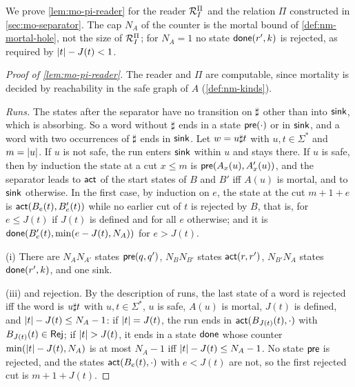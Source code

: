 We prove \cref{lem:mo-pi-reader} for the reader $\mathcal{R}^{\Pi}_I$ and the relation $\Pi$
constructed in \cref{sec:mo-separator}. The cap $N_A$ of the counter is the
mortal bound of \cref{def:nm-mortal-hole}, not the size of $\mathcal{R}^{\Pi}_I$; for $N_A=1$
no state $\mathsf{done}(r',k)$ is rejected, as required by $\lvert t\rvert-J(t)<1$.

\begin{proof}[Proof of \cref{lem:mo-pi-reader}]
The reader and $\Pi$ are computable, since mortality is decided by
reachability in the safe graph of $A$ (\cref{def:nm-kinds}).

\emph{Runs.} The states after the separator have no transition on $\sharp$ other
than into $\mathsf{sink}$, which is absorbing. So a word without $\sharp$ ends in a
state $\mathsf{pre}(\cdot)$ or in $\mathsf{sink}$, and a word with two occurrences of $\sharp$
ends in $\mathsf{sink}$. Let $w=u\sharp t$ with $u,t\in\Sigma^*$ and $m=\lvert u\rvert$. If $u$
is not safe, the run enters $\mathsf{sink}$ within $u$ and stays there. If $u$ is
safe, then by induction the state at a cut $x\le m$ is
$\mathsf{pre}(A_x(u),A'_x(u))$, and the separator leads to $\mathsf{act}$ of the start
states of $B$ and $B'$ iff $A(u)$ is mortal, and to $\mathsf{sink}$ otherwise. In the
first case, by induction on $e$, the state at the cut $m+1+e$ is
$\mathsf{act}(B_e(t),B'_e(t))$ while no earlier cut of $t$ is rejected by $B$, that is,
for $e\le J(t)$ if $J(t)$ is defined and for all $e$ otherwise; and it is
$\mathsf{done}(B'_e(t),\min(e-J(t),N_A))$ for $e>J(t)$.

(i) There are $N_AN_{A'}$ states $\mathsf{pre}(q,q')$, $N_BN_{B'}$ states
$\mathsf{act}(r,r')$, $N_{B'}N_A$ states $\mathsf{done}(r',k)$, and one sink.

(iii) and rejection. By the description of runs, the last state of a word is
rejected iff the word is $u\sharp t$ with $u,t\in\Sigma^*$, $u$ is safe, $A(u)$
is mortal, $J(t)$ is defined, and $\lvert t\rvert-J(t)\le N_A-1$: if $\lvert t\rvert=J(t)$, the
run ends in $\mathsf{act}(B_{J(t)}(t),\cdot)$ with $B_{J(t)}(t)\in\mathsf{Rej}$; if $\lvert t\rvert>J(t)$, it ends in a state $\mathsf{done}$ whose counter $\min(\lvert t\rvert-J(t),N_A)$ is
at most $N_A-1$ iff $\lvert t\rvert-J(t)\le N_A-1$. No state $\mathsf{pre}$ is rejected, and
the states $\mathsf{act}(B_e(t),\cdot)$ with $e<J(t)$ are not, so the first rejected
cut is $m+1+J(t)$.


\end{proof}
